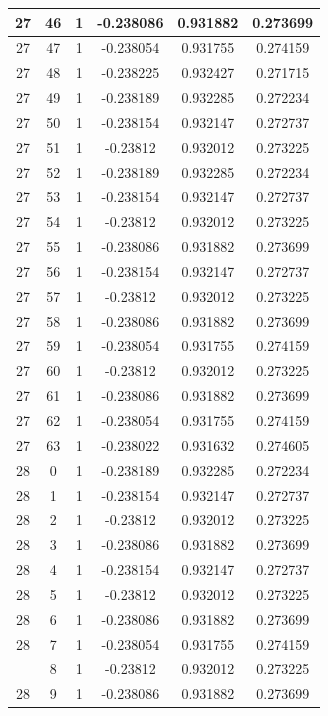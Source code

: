 \documentclass[12pt,a4paper]{article}
\numberwithin{equation}{section}
\numberwithin{figure}{section}
\numberwithin{table}{section}
\begin{document}
\begin{longtable}{|c|c|c|c|c|c|}
27 & 46 & 1 & -0.238086 & 0.931882 & 0.273699 \\ \hline
27 & 47 & 1 & -0.238054 & 0.931755 & 0.274159 \\ \hline
27 & 48 & 1 & -0.238225 & 0.932427 & 0.271715 \\ \hline
27 & 49 & 1 & -0.238189 & 0.932285 & 0.272234 \\ \hline
27 & 50 & 1 & -0.238154 & 0.932147 & 0.272737 \\ \hline
27 & 51 & 1 & -0.23812 & 0.932012 & 0.273225 \\ \hline
27 & 52 & 1 & -0.238189 & 0.932285 & 0.272234 \\ \hline
27 & 53 & 1 & -0.238154 & 0.932147 & 0.272737 \\ \hline
27 & 54 & 1 & -0.23812 & 0.932012 & 0.273225 \\ \hline
27 & 55 & 1 & -0.238086 & 0.931882 & 0.273699 \\ \hline
27 & 56 & 1 & -0.238154 & 0.932147 & 0.272737 \\ \hline
27 & 57 & 1 & -0.23812 & 0.932012 & 0.273225 \\ \hline
27 & 58 & 1 & -0.238086 & 0.931882 & 0.273699 \\ \hline
27 & 59 & 1 & -0.238054 & 0.931755 & 0.274159 \\ \hline
27 & 60 & 1 & -0.23812 & 0.932012 & 0.273225 \\ \hline
27 & 61 & 1 & -0.238086 & 0.931882 & 0.273699 \\ \hline
27 & 62 & 1 & -0.238054 & 0.931755 & 0.274159 \\ \hline
27 & 63 & 1 & -0.238022 & 0.931632 & 0.274605 \\ \hline
28 & 0 & 1 & -0.238189 & 0.932285 & 0.272234 \\ \hline
28 & 1 & 1 & -0.238154 & 0.932147 & 0.272737 \\ \hline
28 & 2 & 1 & -0.23812 & 0.932012 & 0.273225 \\ \hline
28 & 3 & 1 & -0.238086 & 0.931882 & 0.273699 \\ \hline
28 & 4 & 1 & -0.238154 & 0.932147 & 0.272737 \\ \hline
28 & 5 & 1 & -0.23812 & 0.932012 & 0.273225 \\ \hline
28 & 6 & 1 & -0.238086 & 0.931882 & 0.273699 \\ \hline
28 & 7 & 1 & -0.238054 & 0.931755 & 0.274159 \\ \hline
\pagebreak
28 & 8 & 1 & -0.23812 & 0.932012 & 0.273225 \\ \hline
28 & 9 & 1 & -0.238086 & 0.931882 & 0.273699 \\ \hline

\end{longtable}
\end{document}
